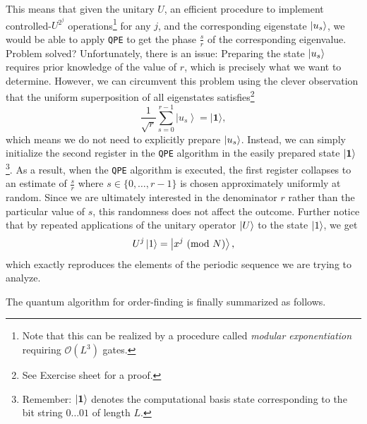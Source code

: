 This means that given the unitary $U$, an efficient procedure to implement controlled-$U^{2^j}$ operations\footnote{Note that this can be realized by a procedure called \textit{modular exponentiation} requiring $\mathcal{O}(L^3)$ gates.} for any $j$, and the corresponding eigenstate $\ket{u_s}$, we would be able to apply \texttt{QPE} to get the phase $\frac{s}{r}$ of the corresponding eigenvalue. Problem solved? Unfortunately, there is an issue: Preparing the state $\ket{u_s}$ requires prior knowledge of the value of $r$, which is precisely what we want to determine. However, we can circumvent this problem using the clever observation that the uniform superposition of all eigenstates satisfies\footnote{See Exercise sheet for a proof.}
\begin{equation}
\frac{1}{\sqrt{r}} \sum_{s=0}^{r-1}\left|u_s\right\rangle=|\mathbf{1}\rangle,
\end{equation}
which means we do not need to explicitly prepare $\ket{u_s}$. Instead, we can simply initialize the second register in the \texttt{QPE} algorithm in the easily prepared state $\ket{\mathbf{1}}$\footnote{Remember: $\ket{\mathbf{1}}$ denotes the computational basis state corresponding to the bit string $0\dots01$ of length $L$.}. As a result, when the \texttt{QPE} algorithm is executed, the first register collapses to an estimate of $\frac{s}{r}$ where $s\in\{0,\dots,r-1\}$ is chosen approximately uniformly at random. Since we are ultimately interested in the denominator $r$ rather than the particular value of $s$, this randomness does not affect the outcome. Further notice that by repeated applications of the unitary operator $\ket{U}$ to the state $\ket{1}$, we get 
\begin{equation}
    U^j\ket{1} = \ket{x^j\ (\mathrm{mod}\ N)},
\end{equation}
which exactly reproduces the elements of the periodic sequence we are trying to analyze.

The quantum algorithm for order-finding is finally summarized as follows.

